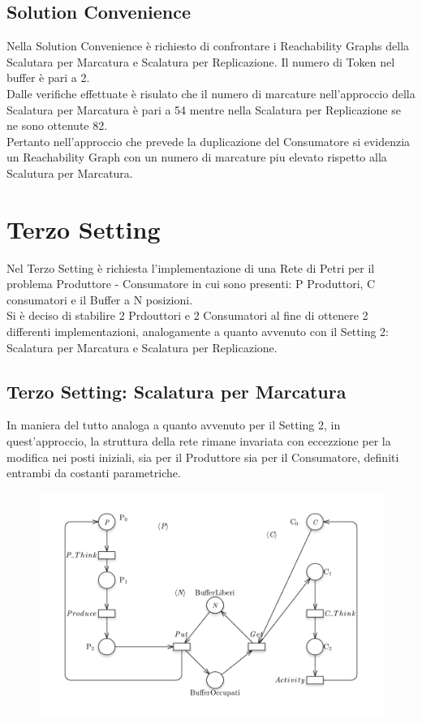 \documentclass{article}
\begin{document}
\subsection{Solution Convenience}
Nella Solution Convenience è richiesto di confrontare i Reachability Graphs della Scalutara per Marcatura e Scalatura per Replicazione. Il numero di Token nel buffer è pari a 2.
\\Dalle verifiche effettuate è risulato che il numero di marcature nell'approccio della Scalatura per Marcatura è pari a 54 mentre nella Scalatura per Replicazione se ne sono ottenute 82.
\\Pertanto nell'approccio che prevede la duplicazione del Consumatore si evidenzia un Reachability Graph con un numero di marcature piu elevato rispetto alla Scalutura per Marcatura.

\clearpage
\section{Terzo  Setting}
Nel Terzo Setting è richiesta l'implementazione di una Rete di Petri per il problema Produttore - Consumatore in cui sono presenti: P Produttori, C consumatori e il Buffer a N posizioni.
\\Si è deciso di stabilire 2 Prdouttori e 2 Consumatori al fine di ottenere 2 differenti implementazioni, analogamente a quanto avvenuto con il Setting 2: Scalatura per Marcatura e Scalatura per Replicazione.
\subsection{Terzo  Setting: Scalatura per Marcatura}
In maniera del tutto analoga a quanto avvenuto per il Setting 2, in quest'approccio, la struttura della rete rimane invariata con eccezzione per la modifica nei posti iniziali, sia per il Produttore sia per il Consumatore, definiti entrambi da costanti parametriche.

\begin{figure}[h] 
\centering
\includegraphics[scale=0.3]{PT-Setting 3 - Marcatura.png}
\end{figure}
\end{document}
